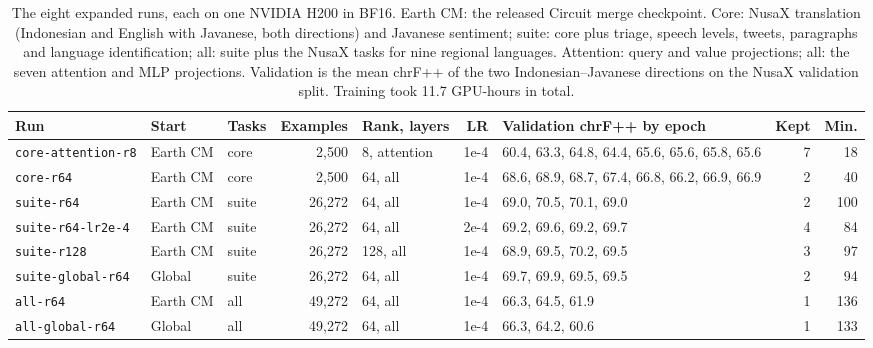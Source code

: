 \documentclass[11pt]{article}
\newcommand{\run}[1]{\texttt{#1}}
\begin{document}
\begin{table}[t]
\centering\small
\setlength{\tabcolsep}{3.5pt}
\begin{tabular}{lllrlrL{4.3cm}rr}
\toprule
Run & Start & Tasks & Examples & Rank, layers & LR & Validation chrF++ by epoch & Kept & Min. \\
\midrule
\run{core-attention-r8} & Earth CM & core & 2,500 & 8, attention & 1e-4 & 60.4, 63.3, 64.8, 64.4, 65.6, 65.6, 65.8, 65.6 & 7 & 18 \\
\run{core-r64} & Earth CM & core & 2,500 & 64, all & 1e-4 & 68.6, 68.9, 68.7, 67.4, 66.8, 66.2, 66.9, 66.9 & 2 & 40 \\
\run{suite-r64} & Earth CM & suite & 26,272 & 64, all & 1e-4 & 69.0, 70.5, 70.1, 69.0 & 2 & 100 \\
\run{suite-r64-lr2e-4} & Earth CM & suite & 26,272 & 64, all & 2e-4 & 69.2, 69.6, 69.2, 69.7 & 4 & 84 \\
\run{suite-r128} & Earth CM & suite & 26,272 & 128, all & 1e-4 & 68.9, 69.5, 70.2, 69.5 & 3 & 97 \\
\run{suite-global-r64} & Global & suite & 26,272 & 64, all & 1e-4 & 69.7, 69.9, 69.5, 69.5 & 2 & 94 \\
\run{all-r64} & Earth CM & all & 49,272 & 64, all & 1e-4 & 66.3, 64.5, 61.9 & 1 & 136 \\
\run{all-global-r64} & Global & all & 49,272 & 64, all & 1e-4 & 66.3, 64.2, 60.6 & 1 & 133 \\
\bottomrule
\end{tabular}
\caption{The eight expanded runs, each on one NVIDIA H200 in BF16. Earth CM: the released Circuit merge
checkpoint. Core: NusaX translation (Indonesian and English with Javanese, both directions) and Javanese
sentiment; suite: core plus triage, speech levels, tweets, paragraphs and language identification; all: suite plus
the NusaX tasks for nine regional languages. Attention: query and value projections; all: the seven attention and
MLP projections. Validation is the mean chrF++ of the two Indonesian--Javanese directions on the NusaX validation
split. Training took 11.7 GPU-hours in total.}
\label{tab:runs}
\end{table}
\end{document}
